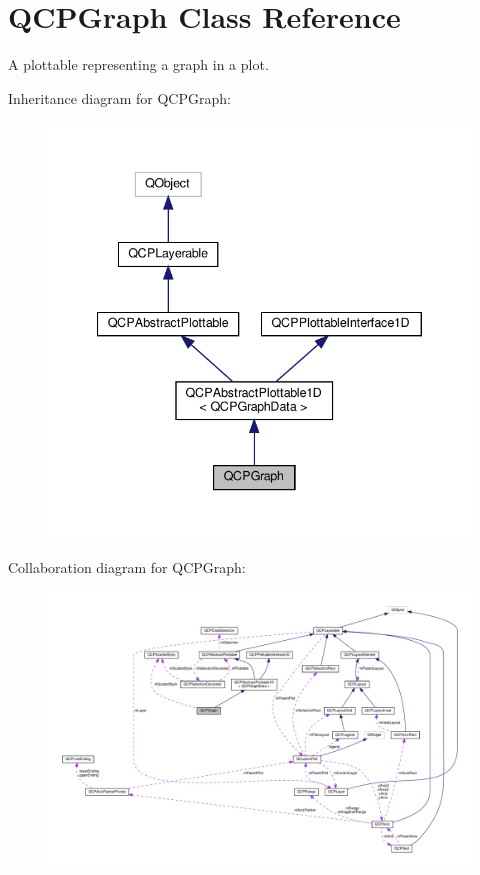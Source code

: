 \hypertarget{classQCPGraph}{}\section{Q\+C\+P\+Graph Class Reference}
\label{classQCPGraph}


A plottable representing a graph in a plot.  




Inheritance diagram for Q\+C\+P\+Graph\+:\nopagebreak
\begin{figure}[H]
\begin{center}
\leavevmode
\includegraphics[width=340pt]{classQCPGraph__inherit__graph}
\end{center}
\end{figure}


Collaboration diagram for Q\+C\+P\+Graph\+:\nopagebreak
\begin{figure}[H]
\begin{center}
\leavevmode
\includegraphics[width=350pt]{classQCPGraph__coll__graph}
\end{center}
\end{figure}
